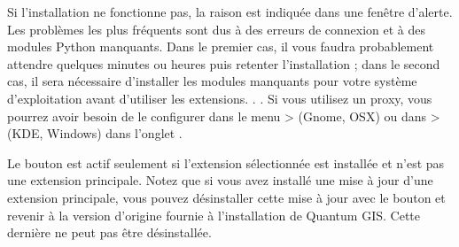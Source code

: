 Si l'installation ne fonctionne pas, la raison est indiquée dans une fenêtre d'alerte. Les problèmes les plus fréquents sont dus à des erreurs de connexion et à des modules Python manquants. Dans le premier cas, il vous faudra probablement attendre quelques minutes ou heures puis retenter l'installation ; dans le second cas, il sera nécessaire d'installer les modules manquants pour votre système d'exploitation avant d'utiliser les extensions. . . Si vous utilisez un proxy, vous pourrez avoir besoin de le configurer dans le menu  >  (Gnome, OSX) ou dans  >  (KDE, Windows) dans l'onglet .

Le bouton  est actif seulement si l'extension sélectionnée est installée et n'est pas une extension principale. Notez que si vous avez installé une mise à jour d'une extension principale, vous pouvez désinstaller cette mise à jour avec le bouton  et revenir à la version d'origine fournie à l'installation de Quantum GIS. Cette dernière ne peut pas être désinstallée.


